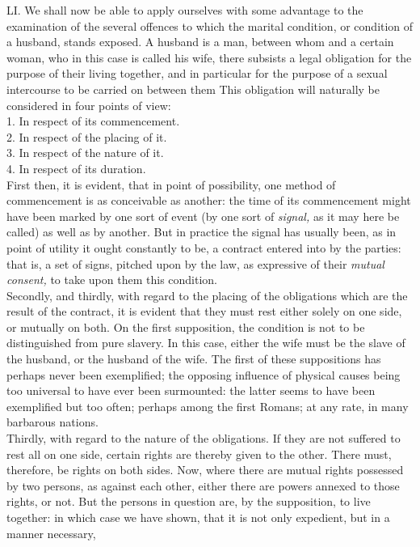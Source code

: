 \documentclass[12pt]{report}
\begin{document}
LI. We shall now be able to apply ourselves with some advantage to the
examination of the several offences to which the marital condition, or
condition of a husband, stands exposed. A husband is a man, between whom
and a certain woman, who in this case is called his wife, there subsists
a legal obligation for the purpose of their living together, and in
particular for the purpose of a sexual intercourse to be carried on
between them This obligation will naturally be considered in four points
of view:\\
1. In respect of its commencement.\\
2. In respect of the placing of it.\\
3. In respect of the nature of it.\\
4. In respect of its duration.\\
First then, it is evident, that in point of possibility, one method of
commencement is as conceivable as another: the time of its commencement
might have been marked by one sort of event (by one sort of
\emph{signal,} as it may here be called) as well as by another. But in
practice the signal has usually been, as in point of utility it ought
constantly to be, a contract entered into by the parties: that is, a set
of signs, pitched upon by the law, as expressive of their \emph{mutual
consent,} to take upon them this condition.\\
Secondly, and thirdly, with regard to the placing of the obligations
which are the result of the contract, it is evident that they must rest
either solely on one side, or mutually on both. On the first
supposition, the condition is not to be distinguished from pure slavery.
In this case, either the wife must be the slave of the husband, or the
husband of the wife. The first of these suppositions has perhaps never
been exemplified; the opposing influence of physical causes being too
universal to have ever been surmounted: the latter seems to have been
exemplified but too often; perhaps among the first Romans; at any rate,
in many barbarous nations.\\
Thirdly, with regard to the nature of the obligations. If they are not
suffered to rest all on one side, certain rights are thereby given to
the other. There must, therefore, be rights on both sides. Now, where
there are mutual rights possessed by two persons, as against each other,
either there are powers annexed to those rights, or not. But the persons
in question are, by the supposition, to live together: in which case we
have shown, that it is not only expedient, but in a manner necessary,
\end{document}
